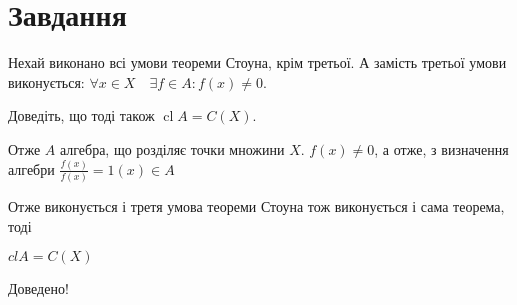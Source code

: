 
\chapter{Завдання \theHchapter}

\begin{tcolorbox}[title=Завдання]
    Нехай виконано всі умови теореми Стоуна, крім третьої. 
    А замість третьої умови виконується: 
    $\forall x \in X \quad \exists f \in A: f(x) \neq 0$. 
    
    
    Доведіть, що тоді також $\operatorname{cl}A=C(X)$.
\end{tcolorbox}



Отже $A$ алгебра, що розділяє точки множини $X$. $f(x) \neq 0$, а отже, 
з визначення алгебри $\frac{f(x)}{f(x)} = 1(x) \in A$


Отже виконується і третя умова теореми Стоуна 
тож виконується і сама теорема, тоді


$clA = C(X)$


Доведено!